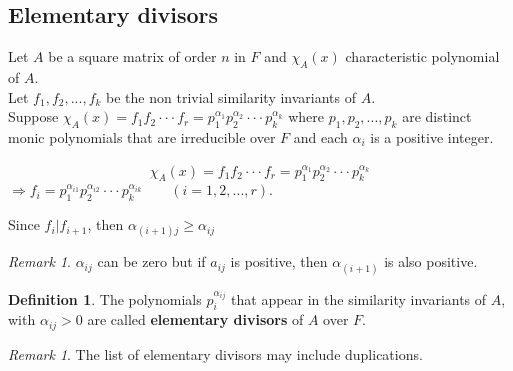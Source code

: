 \documentclass{article}
\theoremstyle{definition}
\newtheorem{defn}[thm]{Definition}
\theoremstyle{remark}
\newtheorem{rem}[thm]{Remark}
\begin{document}
\subsection{Elementary divisors}
Let $A$ be a square matrix of order $n$ in $F$ and $\chi_A(x)$ characteristic polynomial of $A$.\\
Let $f_1,f_2,...,f_k$ be the non trivial similarity invariants of $A$.\\
Suppose $\chi_A(x)=f_1f_2\cdot\cdot\cdot f_r=p_1^{\alpha_1}p_2^{\alpha_2}\cdot\cdot\cdot p_k^{\alpha_k}$ where $p_1,p_2,...,p_k$ are distinct monic polynomials that are irreducible over $F$ and each $\alpha_i$ is a positive integer.

\begin{align}
\chi_A(x)=f_1f_2\cdot\cdot\cdot f_r=p_1^{\alpha_1}p_2^{\alpha_2}\cdot\cdot\cdot p_k^{\alpha_k}
\end{align}
$\Rightarrow f_i=p_1^{\alpha_{i1}}p_2^{\alpha_{i2}}\cdot\cdot\cdot p_k^{\alpha_{ik}}\qquad (i=1,2,...,r).$


Since $f_i|f_{i+1}$, then $\alpha_{(i+1)j} \geq \alpha_{ij}$

\begin{rem}
$\alpha_{ij}$ can be zero but if $a_{ij}$ is positive, then $\alpha_{(i+1)}$ is also positive.
\end{rem}

\begin{defn}
The polynomials $p_i^{\alpha_{ij}}$ that appear in the similarity invariants of $A$, with $\alpha_{ij}>0$ are called \textbf{elementary divisors} of $A$ over $F$.
\end{defn}

\begin{rem}
The list of elementary divisors may include duplications.
\end{rem}
\end{document}
